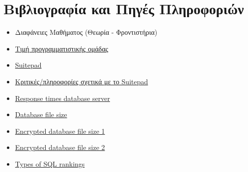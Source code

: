 \section{Βιβλιογραφία και Πηγές Πληροφοριών}
\begin{itemize}
	\item Διαφάνειες Μαθήματος (Θεωρία - Φροντιστήρια)
	\item \href{ https://www.virtualemployee.com/lp/hire-software-developers-india-i/?source=google&medium=cpc&keyword=hire%20a%20software%20engineer&matchtype=b&device=c&campaign=software_development&adgroup=hire_software_engineer_tier1&pos=&net=g&gclid=CjwKCAiAz--OBhBIEiwAG1rIOkDiYrKWjAVtcSgXdPYeqNjCHwsJ2hvWdK-TsnGWImbc7NJc1j4eFBoCCLQQAvD_BwE }{Τιμή προγραμματιστικής ομάδας}
	\item \href{https://www.suitepad.de/de/ }{Suitepad}
	\item \href{https://hoteltechreport.com/guest-experience/guest-room-tablets/suitepad}{Κριτικές/πληροφορίες σχετικά με το Suitepad}
	\item \href{https://wiki.scn.sap.com/wiki/display/WHP/Workload+Analysis+and+Response+times}{Response times database server}
	\item \href{https://docs.microsoft.com/en-us/sharepoint/administration/storage-and-sql-server-capacity-planning-and-configuration}
				{Database file size}
	\item \href{https://dba.stackexchange.com/questions/185419/tde-encryption-on-database-tripled-size-of-backup-files}
				{Encrypted database file size 1}
	\item \href{https://security.stackexchange.com/questions/117068/why-would-an-encrypted-file-be-35-larger-than-an-unencrypted-one}
				{Encrypted database file size 2}	
	\item \href{https://db-engines.com/en/ranking/relational+dbms}{Types of SQL rankings}
\end{itemize}
\clearpage
